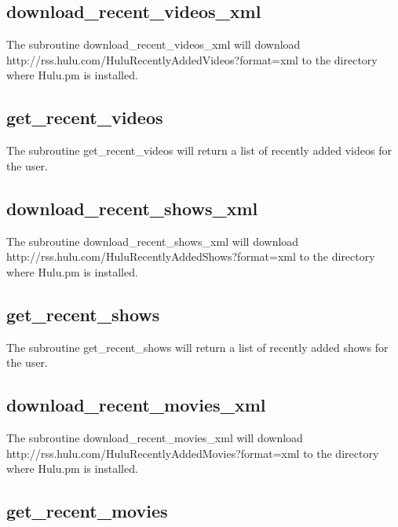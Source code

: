 \subsection*{download\_recent\_videos\_xml\label{download_recent_videos_xml}}


The subroutine download\_recent\_videos\_xml will download http://rss.hulu.com/HuluRecentlyAddedVideos?format=xml
to the directory where Hulu.pm is installed.

\subsection*{get\_recent\_videos\label{get_recent_videos}}


The subroutine get\_recent\_videos will return a list of recently added videos for the user.

\subsection*{download\_recent\_shows\_xml\label{download_recent_shows_xml}}


The subroutine download\_recent\_shows\_xml will download http://rss.hulu.com/HuluRecentlyAddedShows?format=xml
to the directory where Hulu.pm is installed.

\subsection*{get\_recent\_shows\label{get_recent_shows}}


The subroutine get\_recent\_shows will return a list of recently added shows for the user.

\subsection*{download\_recent\_movies\_xml\label{download_recent_movies_xml}}


The subroutine download\_recent\_movies\_xml will download http://rss.hulu.com/HuluRecentlyAddedMovies?format=xml
to the directory where Hulu.pm is installed.

\subsection*{get\_recent\_movies\label{get_recent_movies}}


